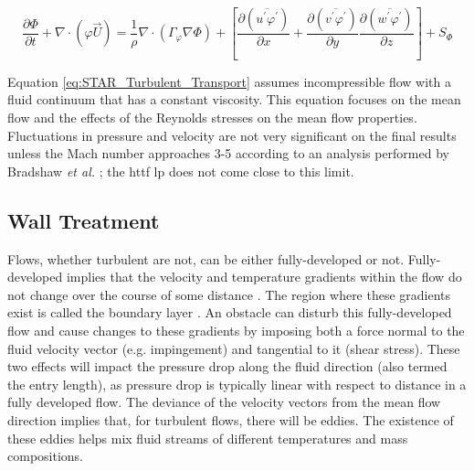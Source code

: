\documentclass[double,12pt]{beavtex}
\begin{document}
\begin{equation}
    \frac{\partial \Phi}{\partial t} + \nabla \cdot (\varphi \overrightarrow{U}) = \frac{1}{\rho} \nabla \cdot (\Gamma_{\varphi} \nabla \Phi) + \left [  \frac{\partial (\overline{u^{'} \varphi^{'}})}{\partial x} + \frac{\partial (\overline{v^{'} \varphi^{'}})}{\partial y} \frac{\partial (\overline{w^{'} \varphi^{'}})}{\partial z} \right ] + S_{\Phi}
\label{eq:STAR_Turbulent_Transport}
\end{equation}

Equation \ref{eq:STAR_Turbulent_Transport} assumes incompressible flow with a fluid continuum that has a constant viscosity. This equation focuses on the mean flow and the effects of the Reynolds stresses on the mean flow properties. Fluctuations in pressure and velocity are not very significant on the final results unless the Mach number approaches 3-5 according to an analysis performed by Bradshaw \emph{et al.} \cite{bradshaw_cebeci_whitelaw_1981}; the \acrshort{httf} \acrshort{lp} does not come close to this limit.

\subsection{Wall Treatment}

Flows, whether turbulent are not, can be either fully-developed or not. Fully-developed implies that the velocity and temperature gradients within the flow do not change over the course of some distance \cite{white_2008}. The region where these gradients exist is called the boundary layer \cite{liburdy_2021}. An obstacle can disturb this fully-developed flow and cause changes to these gradients by imposing both a force normal to the fluid velocity vector (e.g. impingement) and tangential to it (shear stress). These two effects will impact the pressure drop along the fluid direction (also termed the entry length), as pressure drop is typically linear with respect to distance in a fully developed flow. The deviance of the velocity vectors from the mean flow direction implies that, for turbulent flows, there will be eddies. The existence of these eddies helps mix fluid streams of different temperatures and mass compositions.
\end{document}
